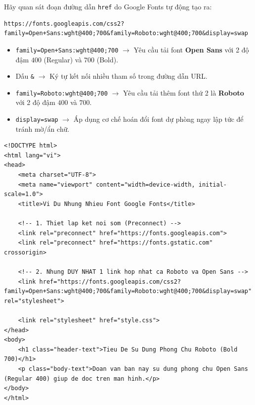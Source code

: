 \documentclass[11pt,oneside]{book}
\newcommand{\codeinline}[1]{\textcolor{accentOrange}{\texttt{#1}}}
\begin{document}
\begin{noteBox}
Hãy quan sát đoạn đường dẫn \codeinline{href} do Google Fonts tự động tạo ra:
\begin{codeWindow}
\begin{lstlisting}[language=HTML5]
https://fonts.googleapis.com/css2?family=Open+Sans:wght@400;700&family=Roboto:wght@400;700&display=swap
\end{lstlisting}
\end{codeWindow}
\begin{itemize}[leftmargin=1.5em, itemsep=2pt, parsep=0pt]
    \item \codeinline{family=Open+Sans:wght@400;700} $\rightarrow$ Yêu cầu tải font \textbf{Open Sans} với 2 độ đậm $400$ (Regular) và $700$ (Bold).
    \item Dấu \codeinline{\&} $\rightarrow$ Ký tự kết nối nhiều tham số trong đường dẫn URL.
    \item \codeinline{family=Roboto:wght@400;700} $\rightarrow$ Yêu cầu tải thêm font thứ 2 là \textbf{Roboto} với 2 độ đậm $400$ và $700$.
    \item \codeinline{display=swap} $\rightarrow$ Áp dụng cơ chế hoán đổi font dự phòng ngay lập tức để tránh mờ/ẩn chữ.
\end{itemize}
\end{noteBox}

\begin{codeWindow}
\begin{lstlisting}[language=HTML5]
<!DOCTYPE html>
<html lang="vi">
<head>
    <meta charset="UTF-8">
    <meta name="viewport" content="width=device-width, initial-scale=1.0">
    <title>Vi Du Nhung Nhieu Font Google Fonts</title>
    
    <!-- 1. Thiet lap ket noi som (Preconnect) -->
    <link rel="preconnect" href="https://fonts.googleapis.com">
    <link rel="preconnect" href="https://fonts.gstatic.com" crossorigin>
    
    <!-- 2. Nhung DUY NHAT 1 link hop nhat ca Roboto va Open Sans -->
    <link href="https://fonts.googleapis.com/css2?family=Open+Sans:wght@400;700&family=Roboto:wght@400;700&display=swap" rel="stylesheet">
    
    <link rel="stylesheet" href="style.css">
</head>
<body>
    <h1 class="header-text">Tieu De Su Dung Phong Chu Roboto (Bold 700)</h1>
    <p class="body-text">Doan van ban nay su dung phong chu Open Sans (Regular 400) giup de doc tren man hinh.</p>
</body>
</html>
\end{lstlisting}
\end{codeWindow}
\end{document}
